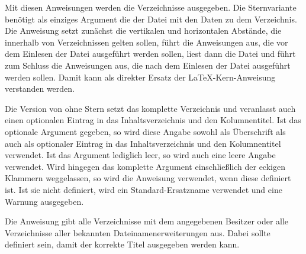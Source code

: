 \begin{Declaration}
\end{Declaration}
Mit diesen Anweisungen werden die Verzeichnisse
ausgegeben. Die Sternvariante 
benötigt als einziges Argument die  der Datei mit den
Daten zu dem Verzeichnis. Die Anweisung setzt zunächst die vertikalen und
horizontalen Abstände, die innerhalb von Verzeichnissen gelten sollen, führt
die Anweisungen aus, die vor dem Einlesen der Datei ausgeführt werden sollen,
liest dann die Datei und führt zum Schluss die Anweisungen aus, die nach dem
Einlesen der Datei ausgeführt werden sollen. Damit kann  als
direkter Ersatz der \LaTeX-Kern-Anweisung
 verstanden
werden.

Die Version von  ohne Stern
setzt das komplette Verzeichnis und veranlasst auch einen optionalen Eintrag
in das Inhaltsverzeichnis und den Kolumnentitel. Ist das optionale Argument
 gegeben, so wird diese Angabe sowohl als Überschrift als
auch als optionaler Eintrag in das Inhaltsverzeichnis und den Kolumnentitel
verwendet. Ist das Argument  lediglich leer, so wird auch eine
leere Angabe verwendet. Wird hingegen das komplette
Argument einschließlich der eckigen Klammern weggelassen, so wird die
Anweisung  verwendet, wenn diese
definiert ist. Ist sie nicht definiert, wird ein Standard-Ersatzname verwendet
und eine Warnung ausgegeben.

Die Anweisung  gibt alle
Verzeichnisse mit dem angegebenen Besitzer oder alle Verzeichnisse aller
bekannten Dateinamenerweiterungen aus. Dabei sollte
 definiert sein, damit der korrekte
Titel ausgegeben werden kann. 

